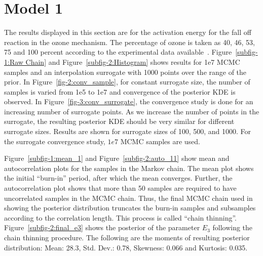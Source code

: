 \section{Model 1}

The results displayed in this section are for the activation energy
for the fall off reaction in the ozone mechanism. The percentage of
ozone is taken as 40, 46, 53, 75 and 100 percent according to the
experimental data available~\cite{Streng}. Figure~\ref{subfig-1:Raw Chain} and Figure~\ref{subfig-2:Histogram}
shows results for 1e7 MCMC samples and an interpolation surrogate with 1000
points over the range of the prior.
In Figure~\ref{fig-2:conv_sample},
for constant surrogate size, the number of samples is varied from
1e5 to 1e7 and convergence of the posterior KDE is observed.
%
In Figure~\ref{fig-3:conv_surrogate}, the convergence
study is done for an increasing number of surrogate points.
As we increase the number of points in the surrogate, the resulting
posterior KDE
should be very similar for different surrogate sizes. Results are shown for
surrogate sizes of 100, 500, and 1000. For the surrogate convergence
study, $1e7$ MCMC samples are used.

\bigskip

Figure~\ref{subfig-1:mean_1} and Figure~\ref{subfig-2:auto_11} show
mean and autocorrelation plots for the samples in the Markov chain.
The mean plot shows the initial ``burn-in'' period, after which the
mean converges. Further, the autocorrelation plot shows that
more than 50 samples are required to have uncorrelated samples in the
MCMC chain. Thus, the final MCMC chain used in showing the posterior
distribution truncates the burn-in samples and subsamples according to
the correlation length. This process is called ``chain thinning''.
Figure~\ref{subfig-2:final_e3} shows the posterior of
the parameter $E_3$ following the chain thinning procedure. The
following are the moments of resulting posterior distribution:
Mean: 28.3, Std. Dev.: 0.78, Skewness: 0.066 and Kurtosis: 0.035.

